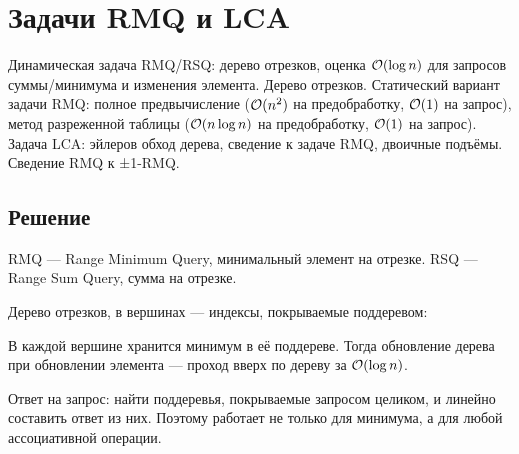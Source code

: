 \section{Задачи RMQ и LCA}
Динамическая задача RMQ/RSQ:
дерево отрезков, оценка $\mathcal{O}(\log n)$
для запросов суммы/минимума
и изменения элемента.
Дерево отрезков.
Статический вариант задачи RMQ:
полное предвычисление
($\mathcal{O}(n^2)$ на предобработку, $\mathcal{O}(1)$ на запрос),
метод разреженной таблицы
($\mathcal{O}(n \log n)$ на предобработку, $\mathcal{O}(1)$ на запрос).
Задача LCA: эйлеров обход дерева,
сведение к задаче RMQ, двоичные подъёмы.
Сведение RMQ к ±1-RMQ.

\subsection{Решение}
RMQ --- Range Minimum Query, минимальный элемент на отрезке.
RSQ --- Range Sum Query, сумма на отрезке.

Дерево отрезков, в вершинах --- индексы,
покрываемые поддеревом:

\begin{center}
\end{center}

В каждой вершине хранится минимум в её поддереве.
Тогда обновление дерева при обновлении элемента
--- проход вверх по дереву за $\mathcal{O}(\log n)$.

Ответ на запрос: найти поддеревья, покрываемые
запросом целиком, и линейно составить ответ из них.
Поэтому работает не только для минимума,
а для любой ассоциативной операции.

